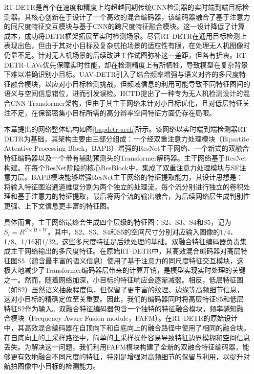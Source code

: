 RT-DETR\cite{Zhao202RTDETR}是首个在速度和精度上均超越同期传统CNN检测器的实时端到端目标检测器。其核心创新在于设计了一个高效的混合编码器，该编码器融合了基于注意力的同尺度特征交互模块与基于CNN的跨尺度特征融合模块。这一设计降低了计算成本，成功将DETR框架拓展至实时检测场景。尽管RT-DETR在通用目标检测上表现出色，但由于其对小目标及复杂航拍场景的适应性有限，在处理无人机图像时仍显不足。针对无人机场景的后续改进工作试图弥补这一差距，但各有折衷。RT-DETR-UAVs\cite{Tan2024UAVAerialDetection}优先保障实时性能，却在检测精度上有所牺牲，导致模型在复杂背景下难以准确识别小目标。UAV-DETR\cite{Zhang2025UAVDETR}引入了结合频率增强与语义对齐的多尺度特征融合模块，以应对小目标检测挑战，但频域信息的利用可能导致不同特征图间的语义与空间信息错位，进而引发误检。HCTD\cite{Xue2025HCTD}提出了一种专为无人机检测设计的混合CNN-Transformer架构，但由于其主干网络未针对小目标优化，且对低层特征关注不足，在保留密集小目标所需的高分辨率空间特征方面仍存在局限。

本章提出的网络整体结构如图\ref{bapdetr-arch}所示。该网络以实时端到端检测器RT-DETR为基础，其架构主要由三部分组成：一个经双重注意力处理模块（Bipartite Attentive Processing Block，BAPB）增强的ResNet主干网络、一个新式的双融合特征编码器以及一个带有辅助预测头的Transformer解码器。主干网络基于ResNet构建。在每个ResNet阶段的核心ResBlock中，集成了双重注意力处理模块与SE注意力层。BAPB模块能够增强ResNet主干网络的特征提取能力，其设计思想是：将输入特征图沿通道维度分割为两个独立的处理流，每个流分别进行独立的卷积处理和基于注意力的特征提取，最后将两个流的输出融合，为后续网络层生成判别性更强、上下文信息更丰富的特征图。

具体而言，主干网络最终会生成四个层级的特征图：S2、S3、S4和S5，记为 $S_i=R^{C\times H\times W}$。其中，S2、S3、S4和S5的空间尺寸分别对应输入图像的1/4、1/8、1/16和1/32。这些多尺度特征是后续处理的基础。双融合特征编码器负责集成主干网络输出的多尺度特征。在原始RT-DETR中，其高效混合编码器对高层特征图S5（蕴含最丰富的语义信息）使用了基于注意力的同尺度特征交互模块，这极大地减少了Transformer编码器层带来的计算开销，是模型实现实时处理的关键之一。然而，随着网络加深，小目标的特征响应会逐渐减弱。相反，低层特征图（如S2）虽然语义抽象程度低，但保留了更丰富的纹理、边缘等高频细节信息，这对小目标的精确定位至关重要。因此，我们的编码器同时将高层特征S5和低层特征S2作为输入。双融合特征编码器包含一个独特的特征融合模块，频率感知融合模块（Frequency-Aware Fusion module，FAFM）。在RT-DETR的原始设计中，其高效混合编码器在自顶向下和自底向上的融合路径中使用了相同的融合块。在自底向上的上采样路径中，简单的上采样操作容易导致特征边界模糊和空间信息丢失。为解决这一问题，我们利用FAFM模块构建了全新的双融合特征编码器，能够更有效地融合不同尺度的特征，特别是增强对高频细节的保留与利用，以提升对航拍图像中小目标的检测能力。

